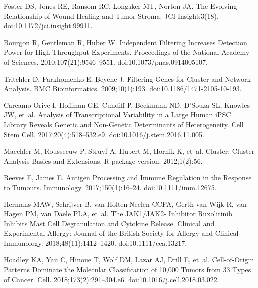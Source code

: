 \documentclass[10pt,letterpaper]{article}
\begin{document}
\begin{thebibliography}{10}
Foster DS, Jones RE, Ransom RC, Longaker MT, Norton JA.
\newblock The Evolving Relationship of Wound Healing and Tumor Stroma.
\newblock JCI Insight;3(18).
\newblock doi:{10.1172/jci.insight.99911}.

Bourgon R, Gentleman R, Huber W.
\newblock Independent Filtering Increases Detection Power for High-Throughput
Experiments.
\newblock Proceedings of the National Academy of Sciences.
2010;107(21):9546--9551.
\newblock doi:{10.1073/pnas.0914005107}.

Tritchler D, Parkhomenko E, Beyene J.
\newblock Filtering {{Genes}} for {{Cluster}} and {{Network Analysis}}.
\newblock BMC Bioinformatics. 2009;10(1):193.
\newblock doi:{10.1186/1471-2105-10-193}.

{Carcamo-Orive} I, Hoffman GE, Cundiff P, Beckmann ND, D'Souza SL, Knowles JW,
et~al.
\newblock Analysis of {{Transcriptional Variability}} in a {{Large Human iPSC
		Library Reveals Genetic}} and {{Non}}-Genetic {{Determinants}} of
{{Heterogeneity}}.
\newblock Cell Stem Cell. 2017;20(4):518--532.e9.
\newblock doi:{10.1016/j.stem.2016.11.005}.

Maechler M, Rousseeuw P, Struyf A, Hubert M, Hornik K, et~al.
\newblock Cluster: Cluster Analysis Basics and Extensions.
\newblock R package version. 2012;1(2):56.

Reeves E, James E.
\newblock Antigen Processing and Immune Regulation in the Response to Tumours.
\newblock Immunology. 2017;150(1):16--24.
\newblock doi:{10.1111/imm.12675}.

Hermans MAW, Schrijver B, {van Holten-Neelen} CCPA, {Gerth van Wijk} R, {van
	Hagen} PM, {van Daele} PLA, et~al.
\newblock The {{JAK1}}/{{JAK2}}- Inhibitor Ruxolitinib Inhibits Mast Cell
Degranulation and Cytokine Release.
\newblock Clinical and Experimental Allergy: Journal of the British Society for
Allergy and Clinical Immunology. 2018;48(11):1412--1420.
\newblock doi:{10.1111/cea.13217}.

Hoadley KA, Yau C, Hinoue T, Wolf DM, Lazar AJ, Drill E, et~al.
\newblock Cell-of-{{Origin Patterns Dominate}} the {{Molecular Classification}}
of 10,000 {{Tumors}} from 33 {{Types}} of {{Cancer}}.
\newblock Cell. 2018;173(2):291--304.e6.
\newblock doi:{10.1016/j.cell.2018.03.022}.


\end{thebibliography}
\end{document}
